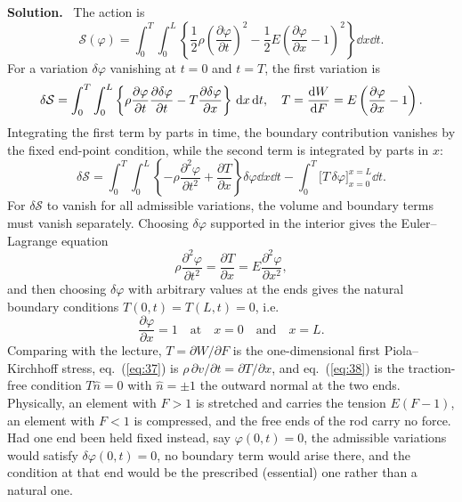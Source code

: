 \documentclass[a4paper,12pt]{paper}
\newenvironment{solution}{\par\noindent\textbf{Solution.}\ }{\par\medskip}
\begin{document}
\begin{solution}
The action is
\begin{equation}
\mathcal{S}(\varphi)=\int_{0}^{T}\int_{0}^{L}\left\{\frac{1}{2}\rho\left(\frac{\partial\varphi}{\partial t}\right)^{2}
-\frac{1}{2}E\left(\frac{\partial\varphi}{\partial x}-1\right)^{2}\right\}\dd x\dd t.
\label{eq:34}
\end{equation}
For a variation $\delta\varphi$ vanishing at $t=0$ and $t=T$, the first variation is
\begin{equation}
\delta\mathcal{S}=\int_{0}^{T}\int_{0}^{L}\left\{\rho\frac{\partial\varphi}{\partial t}\frac{\partial\delta\varphi}{\partial t}
-T\frac{\partial\delta\varphi}{\partial x}\right\}\,\mathrm{d} x\,\mathrm{d} t,\quad
T=\frac{\mathrm{d} W}{\mathrm{d} F}=E\left(\frac{\partial\varphi}{\partial x}-1\right).
\label{eq:35}
\end{equation}
Integrating the first term by parts in time, the boundary contribution vanishes by the
fixed end-point condition, while the second term is integrated by parts in $x$:
\begin{equation}
\delta\mathcal{S}=\int_{0}^{T}\int_{0}^{L}\left\{-\rho\frac{\partial^{2}\varphi}{\partial t^{2}}+\frac{\partial T}{\partial x}\right\}\delta\varphi\dd x\dd t
-\int_{0}^{T}\Big[T\,\delta\varphi\Big]_{x=0}^{x=L}\dd t.
\label{eq:36}
\end{equation}
For $\delta\mathcal{S}$ to vanish for all admissible variations, the volume and boundary
terms must vanish separately. Choosing $\delta\varphi$ supported in the interior gives the
Euler--Lagrange equation
\begin{equation}
\rho\frac{\partial^{2}\varphi}{\partial t^{2}}=\frac{\partial T}{\partial x}=E\frac{\partial^{2}\varphi}{\partial x^{2}},
\label{eq:37}
\end{equation}
and then choosing $\delta\varphi$ with arbitrary values at the ends gives the natural boundary
conditions $T(0,t)=T(L,t)=0$, i.e.\
\begin{equation}
\frac{\partial\varphi}{\partial x}=1\quad\mbox{at}\quad x=0\quad\mbox{and}\quad x=L.
\label{eq:38}
\end{equation}
Comparing with the lecture, $T=\partial W/\partial F$ is the one-dimensional first
Piola--Kirchhoff stress, eq.~(\ref{eq:37}) is $\rho\,\partial v/\partial t=\partial T/\partial x$,
and eq.~(\ref{eq:38}) is the traction-free condition $T\hat{n}=0$ with $\hat{n}=\pm1$ the
outward normal at the two ends. Physically, an element with $F>1$ is stretched and carries
the tension $E(F-1)$, an element with $F<1$ is compressed, and the free ends of the rod
carry no force. Had one end been held fixed instead, say $\varphi(0,t)=0$, the admissible
variations would satisfy $\delta\varphi(0,t)=0$, no boundary term would arise there, and the
condition at that end would be the prescribed (essential) one rather than a natural one.


\end{solution}
\end{document}
